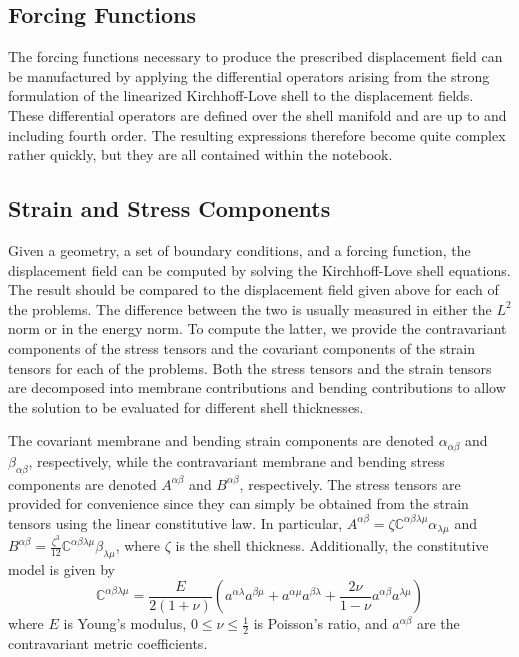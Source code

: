 \documentclass[10pt]{article}
\numberwithin{equation}{section}
\begin{document}
\subsection*{Forcing Functions}

The forcing functions necessary to produce the prescribed displacement field can be manufactured by applying the differential operators arising from the strong formulation of the linearized Kirchhoff-Love shell to the displacement fields. These differential operators are defined over the shell manifold and are up to and including fourth order. The resulting expressions therefore become quite complex rather quickly, but they are all contained within the notebook.

\subsection*{Strain and Stress Components}

Given a geometry, a set of boundary conditions, and a forcing function, the displacement field can be computed by solving the Kirchhoff-Love shell equations. The result should be compared to the displacement field given above for each of the problems. The difference between the two is usually measured in either the $L^2$ norm or in the energy norm. To compute the latter, we provide the contravariant components of the stress tensors and the covariant components of the strain tensors for each of the problems. Both the stress tensors and the strain tensors are decomposed into membrane contributions and bending contributions to allow the solution to be evaluated for different shell thicknesses.

The covariant membrane and bending strain components are denoted $\alpha_{\alpha\beta}$ and $\beta_{\alpha\beta}$, respectively, while the contravariant membrane and bending stress components are denoted $A^{\alpha\beta}$ and $B^{\alpha\beta}$, respectively. The stress tensors are provided for convenience since they can simply be obtained from the strain tensors using the linear constitutive law. In particular, $A^{\alpha\beta} = \zeta \mathbb{C}^{\alpha\beta\lambda\mu} \alpha_{\lambda\mu}$ and $B^{\alpha\beta} = \frac{\zeta^3}{12} \mathbb{C}^{\alpha\beta\lambda\mu} \beta_{\lambda\mu}$, where $\zeta$ is the shell thickness. Additionally, the constitutive model is given by
\begin{equation*}
 \mathbb{C}^{\alpha\beta\lambda\mu} = \frac{E}{2(1+\nu)}\left( a^{\alpha\lambda}a^{\beta\mu} + a^{\alpha\mu}a^{\beta\lambda} + \frac{2\nu}{1-\nu}a^{\alpha\beta}a^{\lambda\mu} \right)
 \end{equation*}
 where $E$ is Young's modulus, $0 \le \nu \le \frac{1}{2}$ is Poisson's ratio, and $a^{\alpha\beta}$ are the contravariant metric coefficients.
\end{document}
